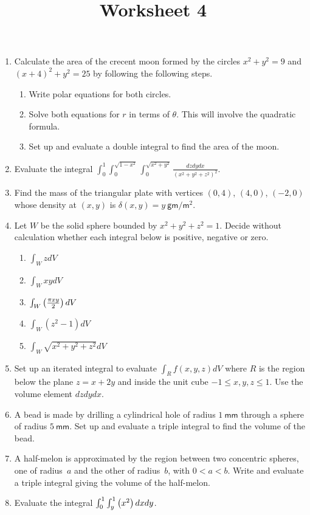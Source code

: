 \documentclass[12pt]{article}
\title{Worksheet 4}
\author{}\date{}
\let\sin\relax\DeclareMathOperator{\sin}{\mathsf{sin}}
\begin{document}
\maketitle
\thispagestyle{empty}

\begin{enumerate}
\item Calculate the area of the crecent moon formed by
the circles $x^2+y^2=9$ and $\left(x+4\right)^2+y^2=25$
by following the following steps.
\begin{enumerate}
\item Write polar equations for both circles.
\item Solve both equations for $r$ in terms of $\theta$. This
will involve the quadratic formula.
\item Set up and evaluate a double integral to find the area
of the moon.
\end{enumerate}

\item Evaluate the integral
$\int_0^1\int_0^{\sqrt{1-x^2}}\int_0^{\sqrt{x^2+y^2}}
\frac{dzdydx}{\left(x^2+y^2+z^2\right)^2}$.

\item Find the mass of the triangular plate with vertices
$\left(0,4\right)$, $\left(4,0\right)$, $\left(-2,0\right)$
whose density at $\left(x,y\right)$ is $\delta\left(x,y\right)
=y~\mathsf{gm}/\mathsf{m}^2$.

\item Let $W$ be the solid sphere bounded by $x^2+y^2+z^2=1$.
Decide without calculation whether each integral below
is positive, negative or zero.
\begin{enumerate}
\item $\int_WzdV$
\item $\int_WxydV$
\item $\int_W\sin\left(\frac{\pi xy}{2}\right)dV$
\item $\int_W\left(z^2-1\right)dV$
\item $\int_W\sqrt{x^2+y^2+z^2}dV$
\end{enumerate}

\item Set up an iterated integral to evaluate
$\int_Rf\left(x,y,z\right)dV$ where $R$ is
the region below the plane $z=x+2y$ and inside
the unit cube $-1\le x,y,z\le 1$. Use the volume
element $dzdydx$.

\item A bead is made by drilling a cylindrical
hole of radius $1~\mathsf{mm}$ through a sphere
of radius $5~\mathsf{mm}$. Set up and evaluate
a triple integral to find the volume of the bead.

\item A half-melon is approximated by the region
between two concentric spheres, one of radius~$a$
and the other of radius~$b$, with $0<a<b$. Write
and evaluate a triple integral giving the volume
of the half-melon.

\item Evaluate the integral
$\int_0^1\int_y^1\sin\left(x^2\right)dxdy$.

\end{enumerate}
\end{document}
